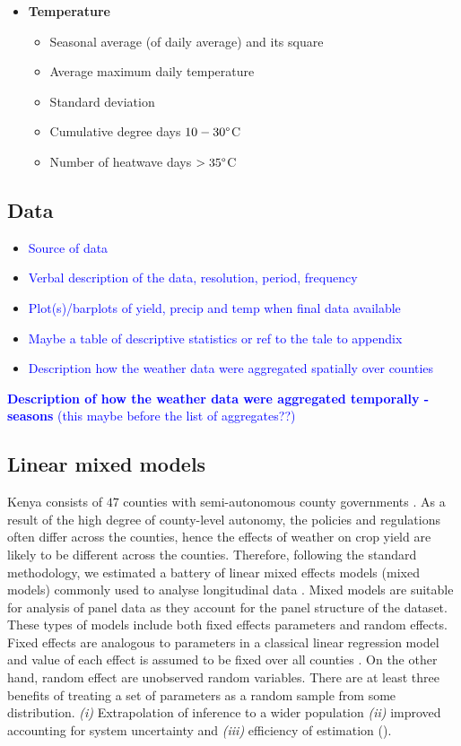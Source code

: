 \documentclass[a4paper,12pt]{article}
\begin{document}
\begin{itemize}
\begin{itemize}
\end{itemize}

\item \textbf{Temperature}
\begin{itemize}
\item Seasonal average (of daily average) and its square
\item Average maximum daily temperature
\item Standard deviation
\item Cumulative degree days $10-30\degree$C
\item Number of heatwave days $>35\degree$C
\end{itemize}
\end{itemize}

\subsection{Data}
\begin{itemize}
\item \textcolor{blue}{Source of data}
\item \textcolor{blue} {Verbal description of the data, resolution, period, frequency}
\item \textcolor{blue} {Plot(s)/barplots of yield, precip and temp when final data available}
\item \textcolor{blue}{Maybe a table of descriptive statistics or ref to the tale to appendix}
\item \textcolor{blue}{Description how the weather data were aggregated spatially over counties}

\end{itemize}

\textcolor{blue}{\textbf{Description of how the weather data were aggregated temporally - seasons} (this maybe before the list of aggregates??)}
\subsection{Linear mixed models}
\sloppy
Kenya consists of $47$ counties with semi-autonomous county governments  \citep{Barasa2017}. As a result of the high degree of county-level autonomy, the policies and regulations often differ across the counties, hence the effects of weather on crop yield are likely to be different across the counties. Therefore, following the standard methodology, we estimated a battery of linear mixed effects models (mixed models) commonly used to analyse longitudinal data \citep{bates2000mixed}. Mixed models are suitable for analysis of panel data as they account for the panel structure of the dataset. These types of models include both fixed effects parameters and random effects. Fixed effects are analogous to parameters in a classical linear regression model and value of each effect is assumed to be fixed over all counties \citep{bates2010lme4}. On the other hand, random effect are unobserved random variables. There are at least three benefits of treating a set of parameters as a random sample from some distribution. \textit{(i)} Extrapolation of inference to a wider population \textit{(ii)} improved accounting for system uncertainty and \textit{(iii)} efficiency of estimation (\citealp{KERYch9, KERYch12}).
\end{document}
